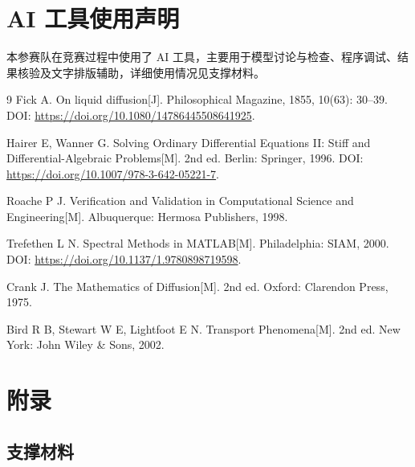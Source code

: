 \documentclass[withoutpreface,bwprint]{cumcmthesis}
\begin{document}
\section*{AI 工具使用声明}

本参赛队在竞赛过程中使用了 AI 工具，主要用于模型讨论与检查、程序调试、结果核验及文字排版辅助，详细使用情况见支撑材料。


\begin{thebibliography}{9}
Fick A. On liquid diffusion[J]. Philosophical Magazine, 1855, 10(63): 30--39. DOI: \url{https://doi.org/10.1080/14786445508641925}.

Hairer E, Wanner G. Solving Ordinary Differential Equations II: Stiff and Differential-Algebraic Problems[M]. 2nd ed. Berlin: Springer, 1996. DOI: \url{https://doi.org/10.1007/978-3-642-05221-7}.

Roache P J. Verification and Validation in Computational Science and Engineering[M]. Albuquerque: Hermosa Publishers, 1998.

Trefethen L N. Spectral Methods in MATLAB[M]. Philadelphia: SIAM, 2000. DOI: \url{https://doi.org/10.1137/1.9780898719598}.

Crank J. The Mathematics of Diffusion[M]. 2nd ed. Oxford: Clarendon Press, 1975.

Bird R B, Stewart W E, Lightfoot E N. Transport Phenomena[M]. 2nd ed. New York: John Wiley \& Sons, 2002.
\end{thebibliography}

\clearpage
\appendix
\section*{附录}
\setcounter{figure}{0}
\setcounter{table}{0}

\subsection*{支撑材料}
\end{document}
